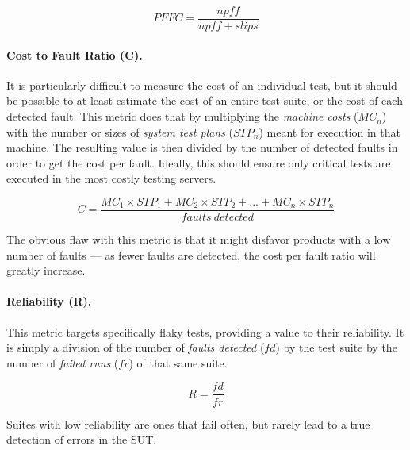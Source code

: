 $$ PFFC = \frac{npff}{npff + slips} $$

\paragraph{Cost to Fault Ratio (C).}
It is particularly difficult to measure the cost of an individual test, but it should be possible to at least estimate the cost of an entire test suite, or the cost of each detected fault.
This metric does that by multiplying the \textit{machine costs} ($MC_n$) with the number or sizes of \textit{system test plans} ($STP_n$) meant for execution in that machine.
The resulting value is then divided by the number of detected faults in order to get the cost per fault.
Ideally, this should ensure only critical tests are executed in the most costly testing servers.

$$ C = \frac{MC_1 \times STP_1 + MC_2 \times STP_2 + ... + MC_n \times STP_n}{faults\ detected} $$

The obvious flaw with this metric is that it might disfavor products with a low number of faults — as fewer faults are detected, the cost per fault ratio will greatly increase.

\paragraph{Reliability (R).}
This metric targets specifically flaky tests, providing a value to their reliability.
It is simply a division of the number of \textit{faults detected} ($fd$) by the test suite by the number of \textit{failed runs} ($fr$) of that same suite.

$$ R = \frac{fd}{fr} $$

Suites with low reliability are ones that fail often, but rarely lead to a true detection of errors in the SUT.